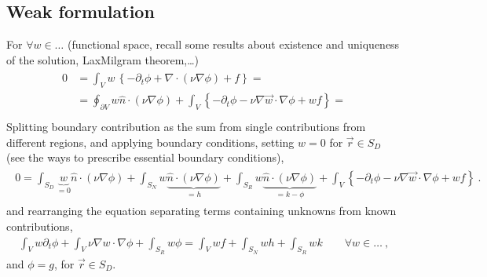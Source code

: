 \documentclass[letterpaper,10pt,english]{jupyterBook}
\begin{document}
\subsection{Weak formulation}
\label{\detokenize{ch/pde/parabolic:weak-formulation}}\label{\detokenize{ch/pde/parabolic:pde-parabolic-heat-weak}}
\sphinxAtStartPar
For \(\forall w \in \dots\) (functional space, recall some results about existence and uniqueness of the solution, Lax\sphinxhyphen{}Milgram theorem,…)
\begin{equation*}
\begin{split}\begin{aligned}
  0
  &  = \int_V w \, \left\{ - \partial_t \phi + \nabla \cdot (\nu \nabla \phi) + f \right\} = \\
  &  = \oint_{\partial V} w \hat{n} \cdot (\nu \nabla \phi) + \int_V \left\{ - \partial_t \phi - \nu \nabla \vec{w} \cdot \nabla \phi  + w f \right\} = \\
\end{aligned}\end{split}
\end{equation*}
\sphinxAtStartPar
Splitting boundary contribution as the sum from single contributions from different regions, and applying boundary conditions, setting \(w = 0\) for \(\vec{r} \in S_D\) (see the ways to prescribe essential boundary conditions),
\begin{equation*}
\begin{split}\begin{aligned}
  0 = \int_{S_D} \underbrace{w}_{= 0} \hat{n} \cdot (\nu \nabla \phi) + \int_{S_N} w \underbrace{\hat{n} \cdot (\nu \nabla \phi)}_{ = h} + \int_{S_R} w \underbrace{ \hat{n} \cdot (\nu \nabla \phi)}_{ = k - \phi } + \int_V \left\{ - \partial_t \phi  - \nu \nabla \vec{w} \cdot \nabla \phi  + w f \right\} \ .
\end{aligned}\end{split}
\end{equation*}
\sphinxAtStartPar
and rearranging the equation separating terms containing unknowns from known contributions,
\begin{equation*}
\begin{split}\int_{V} w \partial_t \phi + \int_{V} \nu \nabla w \cdot \nabla \phi + \int_{S_R} w \phi = \int_{V} w f + \int_{S_N} w h + \int_{S_R} w k \qquad \forall w \in \dots \ ,\end{split}
\end{equation*}
\sphinxAtStartPar
and \(\phi = g\), for \(\vec{r} \in S_D\).
\end{document}
